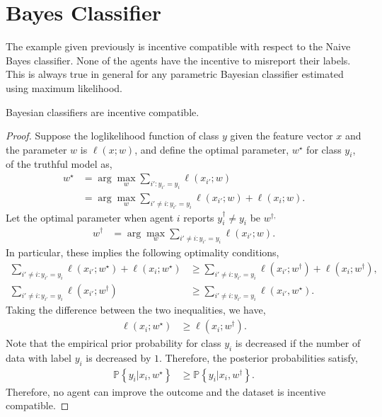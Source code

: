 \documentclass{article}
\begin{document}
\section{Bayes Classifier} 
The example given previously is incentive compatible with respect to the Naive Bayes classifier. None of the agents have the incentive to misreport their labels. This is always true in general for any parametric Bayesian classifier estimated using maximum likelihood.
\newline \newline
\begin{prop} \label{prop:bc} 
Bayesian classifiers are incentive compatible.
\end{prop}
\begin{proof} \label{proof:bcpf} 
Suppose the loglikelihood function of class $y $ given the feature vector $x $ and the parameter $w $ is $\ell\left(x ; w \right)$, and define the optimal parameter, $w^\star $ for class $y_{i}$, of the truthful model as,
\begin{align*}
w^\star  &= \arg\displaystyle\max_{w} \displaystyle\sum_{i' : y_{i'} = y_{i}} \ell\left(x_{i'} ; w\right)
\\ &= \arg\displaystyle\max_{w} \displaystyle\sum_{i' \neq  i : y_{i'} = y_{i}} \ell\left(x_{i'} ; w\right) + \ell\left(x_{i} ; w\right).
\end{align*}
Let the optimal parameter when agent $i $ reports $y^{\dagger}_{i} \neq  y_{i}$ be $w^{\dagger,}$
\begin{align*}
w^{\dagger} &= \arg\displaystyle\max_{w} \displaystyle\sum_{i' \neq  i: y_{i'} = y_{i}} \ell\left(x_{i'} ; w\right).
\end{align*}
In particular, these implies the following optimality conditions,
\begin{align*}
\displaystyle\sum_{i' \neq  i : y_{i'} = y_{i}} \ell\left(x_{i'} ; w^\star \right) + \ell\left(x_{i} ; w^\star \right) &\geq  \displaystyle\sum_{i' \neq  i : y_{i'} = y_{i}} \ell\left(x_{i'} ; w^{\dagger}\right) + \ell\left(x_{i} ; w^{\dagger}\right),
\\ \displaystyle\sum_{i' \neq  i: y_{i'} = y_{i}} \ell\left(x_{i'} ; w^{\dagger}\right) &\geq  \displaystyle\sum_{i' \neq  i: y_{i'} = y_{i}} \ell\left(x_{i'}, w^\star \right).
\end{align*}
Taking the difference between the two inequalities, we have,
\begin{align*}
\ell\left(x_{i} ; w^\star \right) &\geq  \ell\left(x_{i} ; w^{\dagger}\right).
\end{align*}
Note that the empirical prior probability for class $y_{i}$ is decreased if the number of data with label $y_{i}$ is decreased by $1$. Therefore, the posterior probabilities satisfy,
\begin{align*}
\mathbb{P}\left\{y_{i} | x_{i}, w^\star \right\} &\geq  \mathbb{P}\left\{y_{i} | x_{i}, w^{\dagger}\right\}.
\end{align*}
Therefore, no agent can improve the outcome and the dataset is incentive compatible.
\newline \newline\end{proof}
\end{document}
